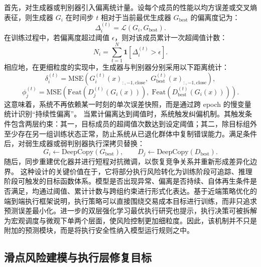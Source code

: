 首先，对生成器或判别器引入偏离统计量。设每个成员的性能以均方误差或交叉熵表征，则生成器 $G_i$ 在时间步 $t$ 相对于当前最优生成器 $G_{\mathrm{best}}$ 的偏离度记为：
\begin{equation}
\Delta_i^{(t)} = \mathcal{L}(G_i, G_{\mathrm{best}}).
\label{eq:delta_stat_new}
\end{equation}
在训练过程中，若偏离度超过阈值 $\epsilon$，则对该成员累计一次超阈值计数：
\begin{equation}
N_i = \sum_{t=1}^{N} \mathbf{1}\left[ \Delta_i^{(t)} > \epsilon \right].
\label{eq:deviation_count_new}
\end{equation}
相应地，在更细粒度的实现中，生成器与判别器分别采用以下距离统计：
\begin{equation}
\delta_i^{(t)} = \mathrm{MSE}\left( G_i^{(t)}(x)_{:, -1, \text{close}},\; G_{\mathrm{best}}^{(t)}(x)_{:, -1, \text{close}} \right),
\end{equation}
\begin{equation}
\phi_j^{(t)} = \mathrm{MSE}\left( \mathrm{Feat}\left( D_j^{(t)}(G_i(x))\right),\; \mathrm{Feat}\left( D_{\mathrm{best}}^{(t)}(G_i(x))\right) \right).
\end{equation}
这意味着，系统不再依赖某一时刻的单次误差快照，而是通过跨 epoch 的慢变量统计识别“持续性偏离”。
当累计偏离达到阈值时，系统触发纠偏机制。其触发条件包含两层约束：其一，目标成员的超阈值次数达到设定阈值；其二，除目标组外至少存在另一组训练状态正常，防止系统从已退化群体中复制错误能力。满足条件后，对弱生成器或弱判别器执行深拷贝替换：
\[
G_i \gets \text{DeepCopy}(G_{\mathrm{best}}), \qquad
D_j \gets \text{DeepCopy}(D_{\mathrm{best}}).
\]
随后，同步重建优化器并进行短程对抗微调，以恢复竞争关系并重新形成差异化边界。
这种设计的关键价值在于，它将部分执行风险转化为训练阶段可追踪、推理阶段可触发的目标函数体系。模型是否出现异常、偏离是否持续、自体再生条件是否满足，均通过阈值、累计计数与跨组约束进行形式化表达。基于近端策略优化的端到端执行框架说明，执行策略可以直接围绕交易成本目标进行训练，而非只追求预测误差最小化\cite{lin2021ppo}。进一步的双层强化学习最优执行研究也提示，执行决策可被拆解为宏观调度与微观下单两个层面，使风险控制更加细粒度\cite{KIM2024124263}。因此，该机制并不只是附加的预测模块，而是将执行安全性纳入模型运行规则之中。

\subsection{滑点风险建模与执行层修复目标}

